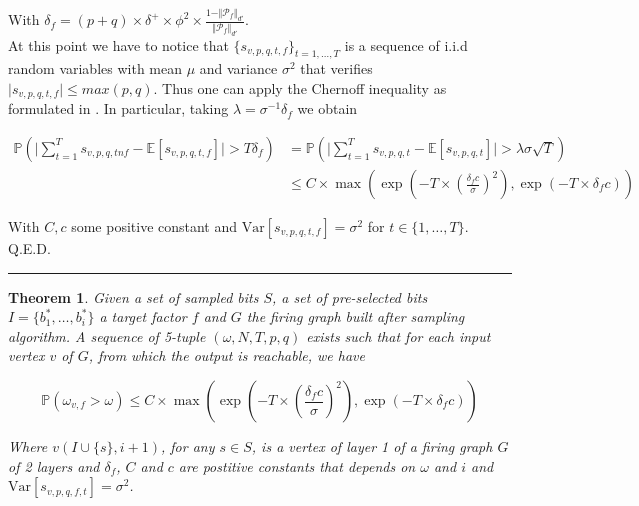 \documentclass[a4paper, 11pt]{article}
\newtheorem{theorem}{Theorem}[section]
\newcommand{\Var}{\mathrm{Var}}
\begin{document}
With $\delta_{f} = (p + q) \times \delta^{+} \times \phi^{2} \times \frac{1 - \Vert \mathcal{P}_{f} \Vert_{d'}}{\Vert \mathcal{P}_{f} \Vert_{d'}}$. \\

At this point we have to notice that $\lbrace s_{v, p, q, t, f} \rbrace_{t=1, \ldots, T}$ is a sequence of i.i.d random variables with mean $\mu$ and variance $\sigma^2$ that verifies $\vert s_{v, p, q, t, f} \vert \leq max(p, q)$. Thus one can apply the Chernoff inequality as formulated in \cite{TAO-1}. In particular, taking $\lambda = \sigma^{-1}\delta_{f}$ we obtain

\begin{align*}
\mathbb{P}\left(\vert \sum_{t=1}^{T} s_{v, p, q, tn f} - \mathbb{E}\left[s_{v, p, q, t, f}\right] \vert > T \delta_{f} \right) &= \mathbb{P}\left(\vert \sum_{t=1}^{T} s_{v, p, q, t} - \mathbb{E}\left[s_{v, p, q, t}\right] \vert > \lambda\sigma \sqrt{T} \right)\\
&\leq C \times \max \left( \exp\left(- T \times \left(\frac{\delta_{f} c}{\sigma}\right)^2 \right), \exp\left(- T \times \delta_{f}c \right) \right)
\end{align*}


With $C, c$ some positive constant and $\Var[s_{v, p, q, t, f}] = \sigma^2$ for $t \in \{1, \ldots, T \}$. Q.E.D.

\begin{center}
\rule[0pt]{100pt}{1pt} 
\end{center}

\begin{theorem}
\label{th_precision}
Given a set of sampled bits $S$, a set of pre-selected bits $I =\{b_{1}^{*}, \ldots, b_{i}^{*}\}$ a target factor $f$ and $G$ the firing graph built after sampling algorithm. A sequence of 5-tuple $(\omega, N, T, p, q)$ exists such that for each input vertex $v$ of $G$, from which the output is reachable, we have 

\begin{equation}
\mathbb{P} \left( \omega_{v, f} > \omega \right) \leq C \times \max \left( \exp\left(- T \times \left(\frac{\delta_{f} c}{\sigma}\right)^2 \right), \exp\left(- T \times \delta_{f}c \right) \right)
\end{equation}

Where $v(I \cup \{ s \}, i+1)$, for any $s \in S$, is a vertex of layer 1 of a firing graph $G$ of 2 layers and $\delta_{f}$, $C$ and $c$ are postitive constants that depends on $\omega$ and $i$ and $\Var[s_{v, p, q, f, t}] = \sigma^2$. 
\end{theorem}
\end{document}
